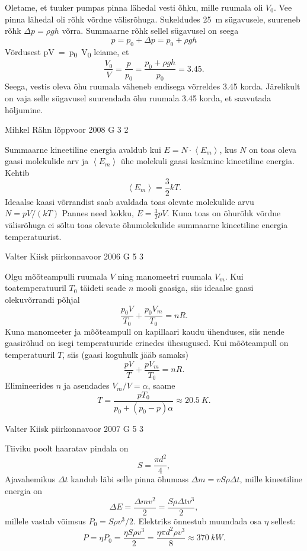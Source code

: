 \documentclass[11pt, twoside]{article}
\begin{document}
{{\ifSolution
Oletame, et tuuker pumpas pinna lähedal vesti õhku, mille ruumala oli $V_0$. Vee pinna lähedal oli rõhk võrdne välisrõhuga. Sukeldudes \SI{25}{m} sügavusele, suureneb rõhk $\Delta p = \rho gh$ võrra. Summaarne rõhk sellel sügavusel on seega
\[
p=p_{0}+\Delta p=p_{0}+\rho g h
\]
Võrdusest \si{pV=p_0V_0} leiame, et
\[
\frac{V_{0}}{V}=\frac{p}{p_{0}}=\frac{p_{0}+\rho g h}{p_{0}}=\num{3,45}.
\]
Seega, vestis oleva õhu ruumala väheneb endisega võrreldes \num{3,45} korda. Järelikult on vaja selle sügavusel suurendada õhu ruumala \num{3,45} korda, et saavutada hõljumine.
\fi
}

{Mihkel Rähn} %
{lõppvoor} %
{2008} %
{G 3} %
{2} %
{

\ifSolution
Summaarne kineetiline energia avaldub kui $E = N \cdot \left\langle E_m\right\rangle$, kus $N$ on toas oleva gaasi molekulide arv ja $\left\langle E_m\right\rangle$ ühe molekuli gaasi keskmine kineetiline energia. Kehtib
\[
\left\langle E_{m}\right\rangle=\frac{3}{2} k T.
\]
Ideaalse kaasi võrrandist saab avaldada toas olevate molekulide arvu $N = pV /(kT)$ Pannes need kokku, $E = \frac{3}{2} pV$. Kuna toas on õhurõhk võrdne välisrõhuga ei sõltu toas olevate õhumolekulide summaarne kineetiline energia temperatuurist.
\fi
}

{Valter Kiisk} %
{piirkonnavoor} %
{2006} %
{G 5} %
{3} %
{

\ifSolution
Olgu mõõteampulli ruumala $V$ ning manomeetri ruumala $V_m$. Kui toatemperatuuril $T_0$ täideti seade $n$ mooli gaasiga, siis ideaalse gaasi olekuvõrrandi põhjal
\[
\frac{p_0V}{T_0} + \frac{p_0V_m}{T_0} = nR.
\]
Kuna manomeeter ja mõõteampull on kapillaari kaudu ühenduses, siis nende gaasirõhud on isegi temperatuuride erinedes ühesugused. Kui mõõteampull on temperatuuril $T$, siis (gaasi koguhulk jääb samaks)
\[
\frac{pV}{T} + \frac{pV_m}{T_0} = nR.
\]
Elimineerides $n$ ja asendades $V_m/V = \alpha$, saame
\[
T=\frac{p T_{0}}{p_{0}+\left(p_{0}-p\right) \alpha} \approx \SI{20,5}{K}.
\]
\fi
}

{Valter Kiisk} %
{piirkonnavoor} %
{2007} %
{G 5} %
{3} %
{

\ifSolution
Tiiviku poolt haaratav pindala on
\[
S = \frac{\pi d^2}{4},
\]
Ajavahemikus $\Delta t$ kandub läbi selle pinna õhumass $\Delta m = vS\rho \Delta t$, mille kineetiline energia on
\[
\Delta E=\frac{\Delta m v^{2}}{2}=\frac{S \rho \Delta t v^{3}}{2},
\]
millele vastab võimsus $P_0 = S\rho v^3/2$. Elektriks õnnestub muundada
osa $\eta$ sellest:
\[
P=\eta P_{0}=\frac{\eta S \rho v^{3}}{2}=\frac{\eta \pi d^2 \rho v^{3}}{8} \approx \SI{370}{kW}.
\]
\fi
}

}
\end{document}
